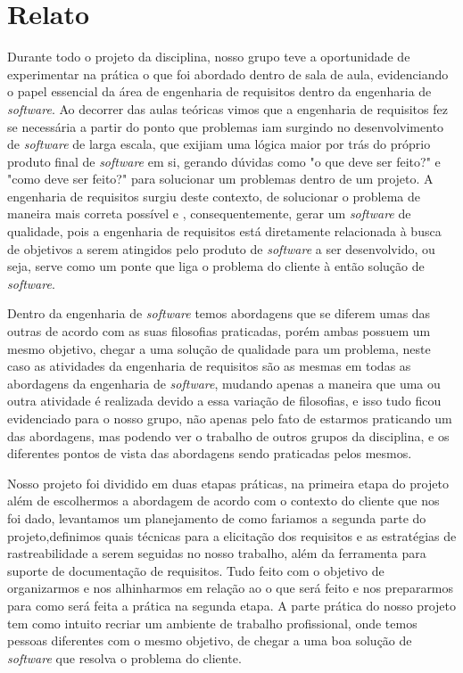 \chapter{Relato}

Durante todo o projeto da disciplina, nosso grupo teve a oportunidade de experimentar na prática o que foi abordado dentro de sala de aula, evidenciando o papel essencial da área de engenharia de requisitos dentro da engenharia de \textit{software}. Ao decorrer das aulas teóricas vimos que a engenharia de requisitos fez se necessária a partir do ponto que problemas iam surgindo no desenvolvimento de \textit{software} de larga escala, que exijiam uma lógica maior por trás do próprio produto final de \textit{software} em si, gerando dúvidas como "o que deve ser feito?" e "como deve ser feito?" para solucionar um problemas dentro de um projeto. A engenharia de requisitos surgiu deste contexto, de solucionar o problema de maneira mais correta possível e , consequentemente, gerar um \textit{software} de qualidade, pois a engenharia de requisitos está diretamente relacionada à busca de objetivos a serem atingidos pelo produto de \textit{software} a ser desenvolvido, ou seja, serve como um ponte que liga o problema do cliente à então solução de \textit{software}.

Dentro da engenharia de \textit{software} temos abordagens que se diferem umas das outras de acordo com as suas filosofias praticadas, porém ambas possuem um mesmo objetivo, chegar a uma solução de qualidade para um problema, neste caso as atividades da engenharia de requisitos são as mesmas em todas as abordagens da engenharia de \textit{software}, mudando apenas a maneira que uma ou outra atividade é realizada devido a essa variação de filosofias, e isso tudo ficou evidenciado para o nosso grupo, não apenas pelo fato de estarmos praticando um das abordagens, mas podendo ver o trabalho de outros grupos da disciplina, e os diferentes pontos de vista das abordagens sendo praticadas pelos mesmos.

Nosso projeto foi dividido em duas etapas práticas, na primeira etapa do projeto além de escolhermos a abordagem de acordo com o contexto do cliente que nos foi dado, levantamos um planejamento de como fariamos a segunda parte do projeto,definimos quais técnicas para a elicitação dos requisitos e as estratégias de rastreabilidade a serem seguidas no nosso trabalho, além da ferramenta para suporte de documentação de requisitos. Tudo feito com o objetivo de organizarmos e nos alhinharmos em relação ao o que será feito e nos prepararmos para como será feita a prática na segunda etapa. A parte prática do nosso projeto tem como intuito recriar um ambiente de trabalho profissional, onde temos pessoas diferentes com o mesmo objetivo, de chegar a uma boa solução de \textit{software} que resolva o problema do cliente.

